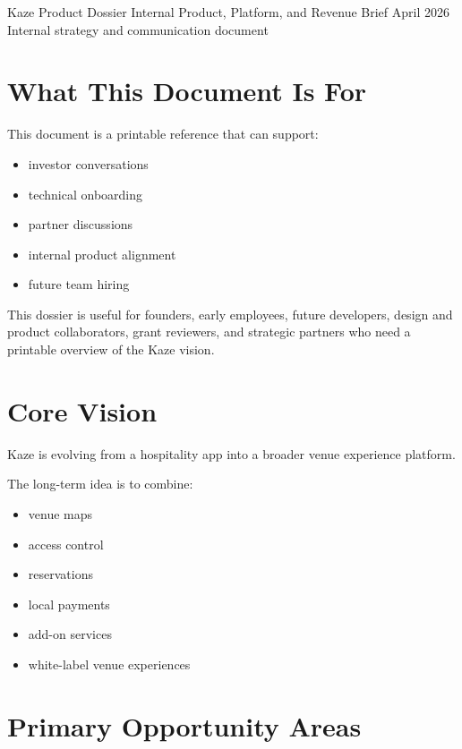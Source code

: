 \documentclass[11pt,a4paper]{article}
\begin{document}
\KazeCover
  {Kaze Product Dossier}
  {Internal Product, Platform, and Revenue Brief}
  {April 2026}
  {Internal strategy and communication document}

\KazeDocumentNotice

\section{What This Document Is For}

This document is a printable reference that can support:
\begin{itemize}
    \item investor conversations
    \item technical onboarding
    \item partner discussions
    \item internal product alignment
    \item future team hiring
\end{itemize}

\begin{kazecalloutbox}
This dossier is useful for founders, early employees, future developers, design and product collaborators, grant reviewers, and strategic partners who need a printable overview of the Kaze vision.
\end{kazecalloutbox}

\section{Core Vision}

Kaze is evolving from a hospitality app into a broader venue experience platform.

The long-term idea is to combine:
\begin{itemize}
    \item venue maps
    \item access control
    \item reservations
    \item local payments
    \item add-on services
    \item white-label venue experiences
\end{itemize}

\section{Primary Opportunity Areas}
\end{document}
